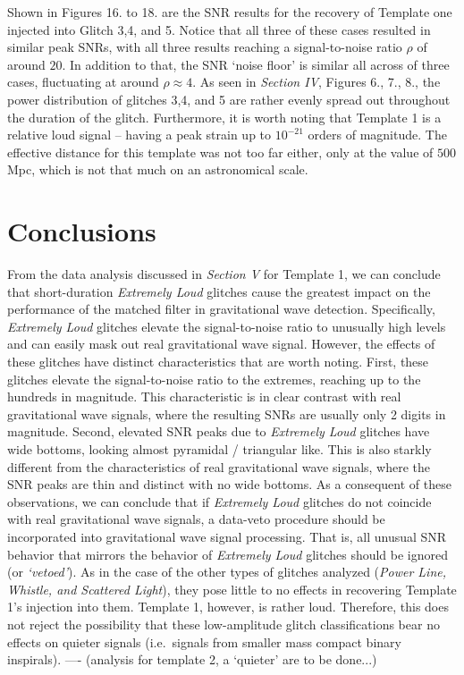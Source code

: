 \documentclass[preprint,
letterpaper,
 amsmath,amssymb,
 aps,
]{revtex4-2}
\begin{document}
Shown in Figures 16. to 18. are the SNR results for the recovery of Template one injected into Glitch 3,4, and 5. Notice that all three of these cases resulted in similar peak SNRs, with all three results reaching a signal-to-noise ratio $\rho$ of around $20$. In addition to that, the SNR `noise floor' is similar all across of three cases, fluctuating at around $\rho\approx 4$. As seen in  \textit{Section IV}, Figures 6., 7., 8., the power distribution of glitches 3,4, and 5 are rather evenly spread out throughout the duration of the glitch. Furthermore, it is worth noting that Template 1 is a relative loud signal – having a peak strain up to $10^{-21}$ orders of magnitude. The effective distance for this template was not too far either, only at the value of $500$ Mpc, which is not that much on an astronomical scale.

\section{Conclusions}
From the data analysis discussed in \textit{Section V} for Template 1, we can conclude that short-duration \textit{Extremely Loud} glitches cause the greatest impact on the performance of the matched filter in gravitational wave detection. Specifically, \textit{Extremely Loud} glitches elevate the signal-to-noise ratio to unusually high levels and can easily mask out real gravitational wave signal. However, the effects of these glitches have distinct characteristics that are worth noting. First, these glitches elevate the signal-to-noise ratio to the extremes, reaching up to the hundreds in magnitude. This characteristic is in clear contrast with real gravitational wave signals, where the resulting SNRs are usually only 2 digits in magnitude. Second, elevated SNR peaks due to \textit{Extremely Loud} glitches have wide bottoms, looking almost pyramidal / triangular like. This is also starkly different from the characteristics of real gravitational wave signals, where the SNR peaks are thin and distinct with no wide bottoms. As a consequent of these observations, we can conclude that if \textit{Extremely Loud} glitches do not coincide with real gravitational wave signals, a data-veto procedure should be incorporated into gravitational wave signal processing. That is, all unusual SNR behavior that mirrors the behavior of \textit{Extremely Loud} glitches should be ignored (or \textit{`vetoed'}). As in the case of the other types of glitches analyzed (\textit{Power Line, Whistle, and Scattered Light}), they pose little to no effects in recovering Template 1's injection into them. Template 1, however, is rather loud. Therefore, this does not reject the possibility that these low-amplitude glitch classifications bear no effects on quieter signals (i.e.\ signals from smaller mass compact binary inspirals). ---- (analysis for template 2, a `quieter' are to be done...)
\end{document}
